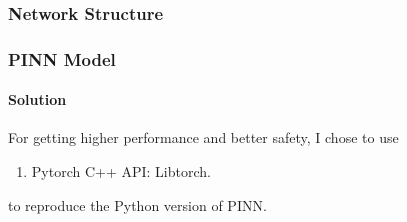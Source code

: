 \subsubsection{Network Structure}
\begin{frame}
  \frametitle{PINN Model}
  \framesubtitle{Solution}
  For getting higher performance and better safety, I chose to use
  \begin{enumerate}
    \item Pytorch C++ API: Libtorch.
  \end{enumerate}
  to reproduce the Python version of PINN.


\end{frame}




